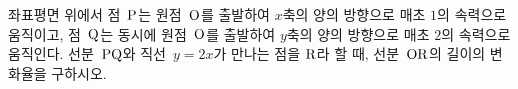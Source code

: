 좌표평면 위에서 점~$\mathrm{P}$는 원점~$\mathrm{O}$를 출발하여 $x$축의 양의 방향으로 매초 $1$의 속력으로 움직이고, 점~$\mathrm{Q}$는 동시에 원점~$\mathrm{O}$를 출발하여 $y$축의 양의 방향으로 매초 $2$의 속력으로 움직인다. 선분~$\mathrm{PQ}$와 직선~$y=2x$가 만나는 점을 $\mathrm{R}$라 할 때, 선분~$\mathrm{OR}$의 길이의 변화율을 구하시오.
